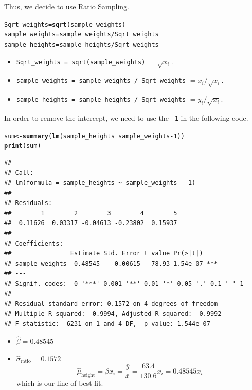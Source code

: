 \documentclass[oneside]{book}\usepackage[]{graphicx}\usepackage[dvipsnames,table,xcdraw]{xcolor}
\makeatletter
\newcommand{\hlnum}[1]{\textcolor[rgb]{0.686,0.059,0.569}{#1}}%
\newcommand{\hlopt}[1]{\textcolor[rgb]{0,0,0}{#1}}%
\newcommand{\hlstd}[1]{\textcolor[rgb]{0.345,0.345,0.345}{#1}}%
\newcommand{\hlkwb}[1]{\textcolor[rgb]{0.69,0.353,0.396}{#1}}%
\newcommand{\hlkwd}[1]{\textcolor[rgb]{0.737,0.353,0.396}{\textbf{#1}}}%
\newenvironment{kframe}{%
 \def\at@end@of@kframe{}%
 \ifinner\ifhmode%
  \def\at@end@of@kframe{\end{minipage}}%
  \begin{minipage}{\columnwidth}%
 \fi\fi%
 \def\FrameCommand##1{\hskip\@totalleftmargin \hskip-\fboxsep
 \colorbox{shadecolor}{##1}\hskip-\fboxsep
     \hskip-\linewidth \hskip-\@totalleftmargin \hskip\columnwidth}%
 \MakeFramed {\advance\hsize-\width
   \@totalleftmargin\z@ \linewidth\hsize
   \@setminipage}}%
 {\par\unskip\endMakeFramed%
 \at@end@of@kframe}
\newenvironment{knitrout}{}{} %
\newcommand{\code}[1]{\texttt{#1}}
\makeatother
\begin{document}
Thus, we decide to use Ratio Sampling.
\begin{knitrout}
\color{fgcolor}\begin{kframe}
\begin{alltt}
\hlstd{Sqrt_weights} \hlkwb{=} \hlkwd{sqrt}\hlstd{(sample_weights)}
\hlstd{sample_weights} \hlkwb{=} \hlstd{sample_weights}\hlopt{/}\hlstd{Sqrt_weights}
\hlstd{sample_heights} \hlkwb{=} \hlstd{sample_heights}\hlopt{/}\hlstd{Sqrt_weights}
\end{alltt}
\end{kframe}
\end{knitrout}
\begin{itemize}
    \item \code{Sqrt\_weights = sqrt(sample\_weights)} $=\sqrt{x_i}$.
    \item \code{sample\_weights = sample\_weights / Sqrt\_weights} $=x_i/\sqrt{x_i}$.
    \item \code{sample\_heights = sample\_heights / Sqrt\_weights} $=y_i/\sqrt{x_i}$.
\end{itemize}
In order to remove the intercept, we need to use the \code{-1} in the following code.
\begin{knitrout}
\color{fgcolor}\begin{kframe}
\begin{alltt}
\hlstd{sum} \hlkwb{<-} \hlkwd{summary}\hlstd{(}\hlkwd{lm}\hlstd{(sample_heights} \hlopt{~} \hlstd{sample_weights} \hlopt{-} \hlnum{1}\hlstd{))}
\hlkwd{print}\hlstd{(sum)}
\end{alltt}
\begin{verbatim}
## 
## Call:
## lm(formula = sample_heights ~ sample_weights - 1)
## 
## Residuals:
##        1        2        3        4        5 
##  0.11626  0.03317 -0.04613 -0.23802  0.15937 
## 
## Coefficients:
##                Estimate Std. Error t value Pr(>|t|)    
## sample_weights  0.48545    0.00615   78.93 1.54e-07 ***
## ---
## Signif. codes:  0 '***' 0.001 '**' 0.01 '*' 0.05 '.' 0.1 ' ' 1
## 
## Residual standard error: 0.1572 on 4 degrees of freedom
## Multiple R-squared:  0.9994,	Adjusted R-squared:  0.9992 
## F-statistic:  6231 on 1 and 4 DF,  p-value: 1.544e-07
\end{verbatim}
\end{kframe}
\end{knitrout}
\begin{itemize}
    \item $\hat{\beta}=0.48545$
    \item $\hat{\sigma}_{\text{ratio}}=0.1572$
          $$\hat{\mu}_{\text{height}}=\hat{\beta}x_i=\frac{\bar{y}}{\bar{x}}=\frac{63.4}{130.6}x_i=0.48545x_i$$
          which is our line of best fit.
\end{itemize}
\end{document}

